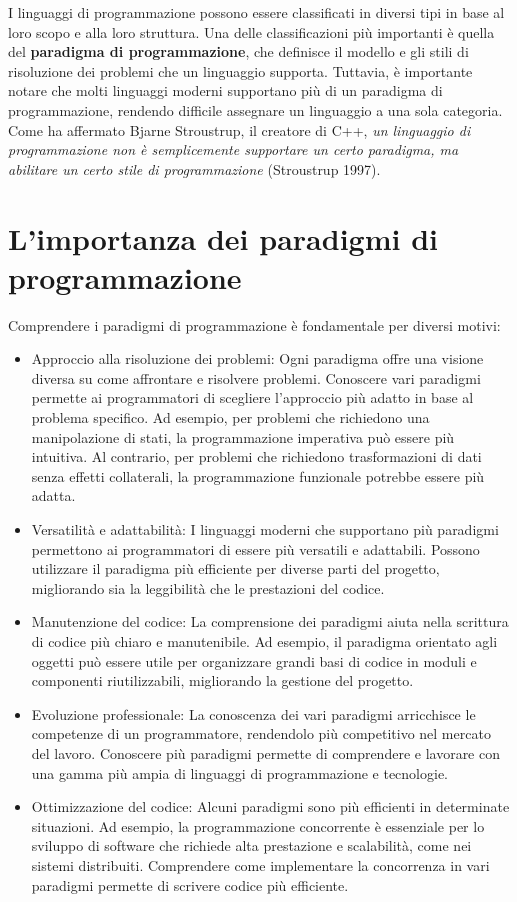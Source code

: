 \documentclass[
  letterpaper,
]{scrbook}
\providecommand{\tightlist}{%
  \setlength{\itemsep}{0pt}\setlength{\parskip}{0pt}}\usepackage{longtable,booktabs,array}
\begin{document}
I linguaggi di programmazione possono essere classificati in diversi
tipi in base al loro scopo e alla loro struttura. Una delle
classificazioni più importanti è quella del \textbf{paradigma di
programmazione}, che definisce il modello e gli stili di risoluzione dei
problemi che un linguaggio supporta. Tuttavia, è importante notare che
molti linguaggi moderni supportano più di un paradigma di
programmazione, rendendo difficile assegnare un linguaggio a una sola
categoria. Come ha affermato Bjarne Stroustrup, il creatore di C++,
\emph{un linguaggio di programmazione non è semplicemente supportare un
certo paradigma, ma abilitare un certo stile di programmazione}
(Stroustrup 1997).

\section{L'importanza dei paradigmi di
programmazione}\label{limportanza-dei-paradigmi-di-programmazione}

Comprendere i paradigmi di programmazione è fondamentale per diversi
motivi:

\begin{itemize}
\tightlist
\item
  Approccio alla risoluzione dei problemi: Ogni paradigma offre una
  visione diversa su come affrontare e risolvere problemi. Conoscere
  vari paradigmi permette ai programmatori di scegliere l'approccio più
  adatto in base al problema specifico. Ad esempio, per problemi che
  richiedono una manipolazione di stati, la programmazione imperativa
  può essere più intuitiva. Al contrario, per problemi che richiedono
  trasformazioni di dati senza effetti collaterali, la programmazione
  funzionale potrebbe essere più adatta.
\item
  Versatilità e adattabilità: I linguaggi moderni che supportano più
  paradigmi permettono ai programmatori di essere più versatili e
  adattabili. Possono utilizzare il paradigma più efficiente per diverse
  parti del progetto, migliorando sia la leggibilità che le prestazioni
  del codice.
\item
  Manutenzione del codice: La comprensione dei paradigmi aiuta nella
  scrittura di codice più chiaro e manutenibile. Ad esempio, il
  paradigma orientato agli oggetti può essere utile per organizzare
  grandi basi di codice in moduli e componenti riutilizzabili,
  migliorando la gestione del progetto.
\item
  Evoluzione professionale: La conoscenza dei vari paradigmi arricchisce
  le competenze di un programmatore, rendendolo più competitivo nel
  mercato del lavoro. Conoscere più paradigmi permette di comprendere e
  lavorare con una gamma più ampia di linguaggi di programmazione e
  tecnologie.
\item
  Ottimizzazione del codice: Alcuni paradigmi sono più efficienti in
  determinate situazioni. Ad esempio, la programmazione concorrente è
  essenziale per lo sviluppo di software che richiede alta prestazione e
  scalabilità, come nei sistemi distribuiti. Comprendere come
  implementare la concorrenza in vari paradigmi permette di scrivere
  codice più efficiente.
\end{itemize}
\end{document}
